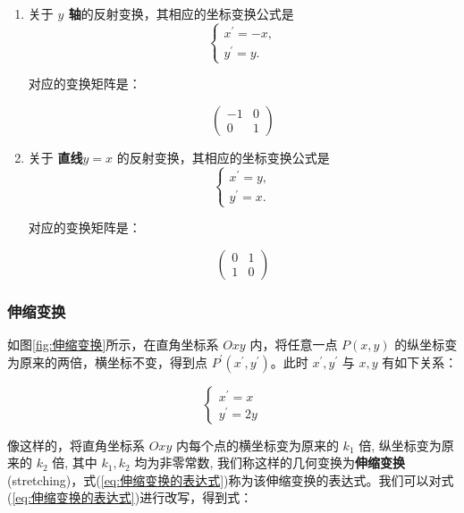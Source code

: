 \documentclass[lang=cn,newtx,10pt,scheme=chinese]{elegantbook}
\begin{document}
\begin{solution}

\begin{enumerate}
    \item 关于 \textbf{$y$ 轴}的反射变换，其相应的坐标变换公式是
$$
\left\{\begin{array}{c}
x^{\prime}=-x, \\
y^{\prime}=y .
\end{array}\right.
$$

对应的变换矩阵是：

$$
 \left(\begin{array}{cc}-1 & 0 \\ 0 & 1\end{array}\right)
$$
\item 关于 \textbf{直线$y=x$} 的反射变换，其相应的坐标变换公式是
$$
\left\{\begin{array}{c}
x^{\prime}=y, \\
y^{\prime}=x .
\end{array}\right.
$$

对应的变换矩阵是：

$$
 \left(\begin{array}{cc}0 & 1 \\ 1 & 0\end{array}\right)
$$
\end{enumerate}
\end{solution}

\subsubsection{伸缩变换}
\label{subsubsec:伸缩变换}

如图\ref{fig:伸缩变换}所示，在直角坐标系 $O x y$ 内，将任意一点 $P(x, y)$ 的纵坐标变为原来的两倍，横坐标不变，得到点 $P^{\prime}\left(x^{\prime}, y^{\prime}\right)$。此时 $x^{\prime}, y^{\prime}$ 与 $x, y$ 有如下关系：

\begin{equation}
\left\{\begin{array}{l}
x^{\prime}=x \\
y^{\prime}=2 y
\end{array}\right.
\label{eq:伸缩变换的表达式}
\end{equation}

像这样的，将直角坐标系 $O x y$ 内每个点的横坐标变为原来的 $k_1$ 倍, 纵坐标变为原来的 $k_2$ 倍, 其中 $k_1, k_2$ 均为非零常数, 我们称这样的几何变换为\textcolor{third}{\bf 伸缩变换} (stretching)，式(\ref{eq:伸缩变换的表达式})称为该伸缩变换的表达式。我们可以对式(\ref{eq:伸缩变换的表达式})进行改写，得到式：
\end{document}
